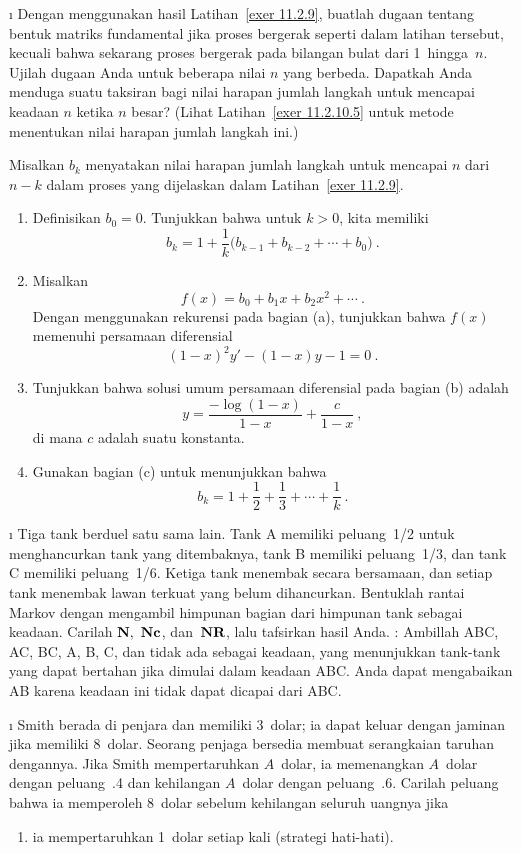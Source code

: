 \begin{LJSItem}
\i\label{exer 11.2.10} Dengan menggunakan hasil Latihan~\ref{exer 11.2.9},
buatlah dugaan tentang bentuk matriks fundamental jika proses bergerak seperti
dalam latihan tersebut, kecuali bahwa sekarang proses bergerak pada bilangan
bulat dari 1~hingga~$n$. Ujilah dugaan Anda untuk beberapa nilai $n$ yang
berbeda. Dapatkah Anda menduga suatu taksiran bagi nilai harapan jumlah langkah
untuk mencapai keadaan $n$ ketika $n$ besar? (Lihat
Latihan~\ref{exer 11.2.10.5} untuk metode menentukan nilai harapan jumlah langkah
ini.)

\istar\label{exer 11.2.10.5} Misalkan $b_k$ menyatakan nilai harapan jumlah
langkah untuk mencapai $n$ dari $n-k$ dalam proses yang dijelaskan dalam
Latihan~\ref{exer 11.2.9}.
\begin{enumerate}
\item
Definisikan $b_0 = 0$. Tunjukkan bahwa untuk $k > 0$, kita memiliki
$$b_k = 1 + \frac 1k \bigl(b_{k-1} + b_{k-2} + \cdots + b_0\bigr)\ .$$
\item
Misalkan
$$f(x) = b_0 + b_1 x + b_2 x^2 + \cdots\ .$$
Dengan menggunakan rekurensi pada bagian (a), tunjukkan bahwa $f(x)$ memenuhi
persamaan diferensial
$$(1-x)^2 y' - (1-x) y - 1 = 0\ .$$
\item
Tunjukkan bahwa solusi umum persamaan diferensial pada bagian (b) adalah
$$y = \frac{-\log(1-x)}{1-x} + \frac c{1-x}\ ,$$
di mana $c$ adalah suatu konstanta.
\item
Gunakan bagian (c) untuk menunjukkan bahwa
$$b_k = 1 + \frac 12 + \frac 13 + \cdots + \frac 1k\ .$$
\end{enumerate}

\i\label{exer 11.2.11} Tiga tank berduel satu sama lain. Tank A memiliki
peluang~1/2 untuk menghancurkan tank yang ditembaknya, tank B memiliki
peluang~1/3, dan tank C memiliki peluang~1/6. Ketiga tank menembak secara
bersamaan, dan setiap tank menembak lawan terkuat yang belum dihancurkan.
Bentuklah rantai Markov dengan mengambil himpunan bagian dari himpunan tank
sebagai keadaan. Carilah ${\mbox{\bf N}\/},~{\mbox{\bf N}\/}{\mbox{\bf c}\/}$, dan~${\mbox{\bf N}\/}{\mbox{\bf R}\/}$, lalu
tafsirkan hasil Anda. : Ambillah ABC, AC, BC, A, B, C, dan tidak
ada sebagai keadaan, yang menunjukkan tank-tank yang dapat bertahan jika
dimulai dalam keadaan ABC. Anda dapat mengabaikan AB karena keadaan ini tidak
dapat dicapai dari ABC.

\i\label{exer 11.2.12} Smith berada di penjara dan memiliki 3~dolar; ia dapat
keluar dengan jaminan jika memiliki 8~dolar. Seorang penjaga bersedia membuat
serangkaian taruhan dengannya. Jika Smith mempertaruhkan $A$~dolar, ia
memenangkan $A$~dolar dengan peluang~.4 dan kehilangan $A$~dolar dengan
peluang~.6. Carilah peluang bahwa ia memperoleh 8~dolar sebelum kehilangan
seluruh uangnya jika
\begin{enumerate}
\item ia mempertaruhkan 1~dolar setiap kali (strategi hati-hati).


\end{enumerate}
\end{LJSItem}
